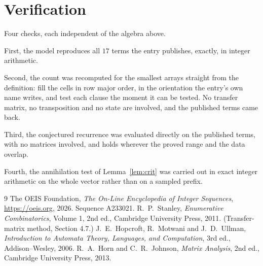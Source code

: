 \documentclass[11pt,a4paper]{article}
\theoremstyle{plain}
\theoremstyle{definition}
\begin{document}
\section{Verification}

Four checks, each independent of the algebra above.

First, the model reproduces all $17$ terms the entry publishes, exactly, in integer
arithmetic.

Second, the count was recomputed for the smallest arrays straight from the definition: fill the
cells in row major order, in the orientation the entry's own name writes, and test each clause
the moment it can be tested. No transfer matrix, no transposition and no state are involved,
and the published terms came back.

Third, the conjectured recurrence was evaluated directly on the published terms, with no
matrices involved, and holds wherever the proved range and the data overlap.

Fourth, the annihilation test of Lemma~\ref{lem:crit} was carried out in exact integer
arithmetic on the whole vector rather than on a sampled prefix.

\begin{thebibliography}{9}
 The OEIS Foundation, \emph{The On-Line Encyclopedia of Integer
Sequences}, \url{https://oeis.org}, 2026. Sequence A233021.
 R.~P.~Stanley, \emph{Enumerative Combinatorics}, Volume 1, 2nd ed.,
Cambridge University Press, 2011. (Transfer-matrix method, Section 4.7.)
 J.~E.~Hopcroft, R.~Motwani and J.~D.~Ullman, \emph{Introduction to Automata
Theory, Languages, and Computation}, 3rd ed., Addison--Wesley, 2006.
 R.~A.~Horn and C.~R.~Johnson, \emph{Matrix Analysis}, 2nd ed., Cambridge
University Press, 2013.
\end{thebibliography}
\end{document}
